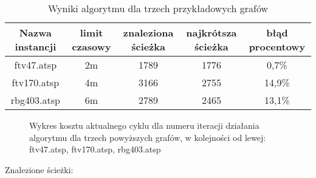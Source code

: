 \documentclass[a4paper]{article}
\begin{document}
\begin{table}
      \begin{center}
            \begin{tabular}{|c|c|c|c|c|}
                  \hline
                  Nazwa instancji & limit czasowy & znaleziona ścieżka & najkrótsza ścieżka & błąd procentowy \\
                  \hline
                  ftv47.atsp      & 2m            & 1789               & 1776               & 0,7\%           \\
                  \hline
                  ftv170.atsp     & 4m            & 3166               & 2755               & 14,9\%          \\
                  \hline
                  rbg403.atsp     & 6m            & 2789               & 2465               & 13,1\%          \\
                  \hline
            \end{tabular}
      \end{center}
      \caption{Wyniki algorytmu dla trzech przykładowych grafów}
\end{table}

\begin{figure}[H]
      \centering
      
      
      
      \caption{Wykres kosztu aktualnego cyklu dla numeru iteracji działania
            algorytmu dla trzech powyższych grafów, w kolejności od lewej:
            ftv47.atsp, ftv170.atsp, rbg403.atsp}
\end{figure}

Znalezione ścieżki:
\end{document}
